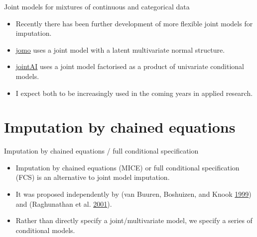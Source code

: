 \documentclass[ignorenonframetext,]{beamer}
\providecommand{\tightlist}{%
  \setlength{\itemsep}{0pt}\setlength{\parskip}{0pt}}
\begin{document}
\begin{frame}{Joint models for mixtures of continuous and categorical
data}
\protect\hypertarget{joint-models-for-mixtures-of-continuous-and-categorical-data-1}{}

\begin{itemize}
\tightlist
\item
  Recently there has been further development of more flexible joint
  models for imputation.
\item
  \href{https://cran.r-project.org/package=jomo}{jomo} uses a joint
  model with a latent multivariate normal structure.
\item
  \href{https://cran.r-project.org/package=JointAI}{jointAI} uses a
  joint model factorised as a product of univariate conditional models.
\item
  I expect both to be increasingly used in the coming years in applied
  research.
\end{itemize}

\end{frame}

\hypertarget{imputation-by-chained-equations}{%
\section{Imputation by chained
equations}\label{imputation-by-chained-equations}}

\begin{frame}{Imputation by chained equations / full conditional
specification}
\protect\hypertarget{imputation-by-chained-equations-full-conditional-specification}{}

\begin{itemize}
\tightlist
\item
  Imputation by chained equations (MICE) or full conditional
  specification (FCS) is an alternative to joint model imputation.
\item
  It was proposed independently by (van Buuren, Boshuizen, and Knook
  \protect\hyperlink{ref-VanBuurenux2fBoshuizenux2fKnook:1999}{1999})
  and (Raghunathan et al.
  \protect\hyperlink{ref-Raghunathanux2fLepkowskiux2fVan-Hoewykux2fSolenberger:2001}{2001}).
\item
  Rather than directly specify a joint/multivariate model, we specify a
  series of conditional models.
\end{itemize}

\end{frame}
\end{document}
